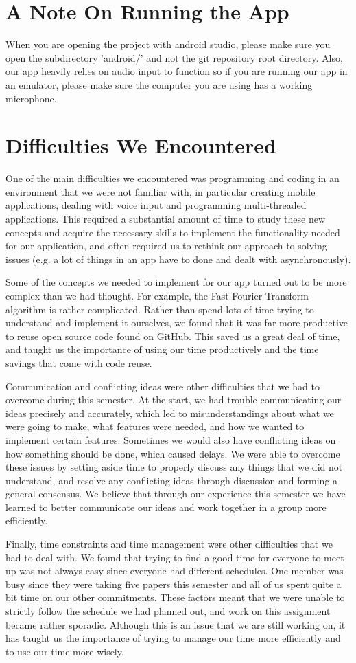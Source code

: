 \documentclass[10pt,a4paper]{article}
\begin{document}
\section{A Note On Running the App}
When you are opening the project with android studio, please make sure you open the subdirectory 'android/' and not the git repository root directory. Also, our app heavily relies on audio input to function so if you are running our app in an emulator, please make sure the computer you are using has a working microphone.

\section{Difficulties We Encountered}
One of the main difficulties we encountered was programming and coding in an environment that we were not familiar with, in particular creating mobile applications, dealing with voice input and programming multi-threaded applications. This required a substantial amount of time to study these new concepts and acquire the necessary skills to implement the functionality needed for our application, and often required us to rethink our approach to solving issues (e.g. a lot of things in an app have to done and dealt with asynchronously).

Some of the concepts we needed to implement for our app turned out to be more complex than we had thought. For example, the Fast Fourier Transform algorithm is rather complicated. Rather than spend lots of time trying to understand and implement it ourselves, we found that it was far more productive to reuse open source code found on GitHub. This saved us a great deal of time, and taught us the importance of using our time productively and the time savings that come with code reuse.

Communication and conflicting ideas were other difficulties that we had to overcome during this semester. At the start, we had trouble communicating our ideas precisely and accurately, which led to misunderstandings about what we were going to make, what features were needed, and how we wanted to implement certain features. Sometimes we would also have conflicting ideas on how something should be done, which caused delays. We were able to overcome these issues by setting aside time to properly discuss any things that we did not understand, and resolve any conflicting ideas through discussion and forming a general consensus. We believe that through our experience this semester we have learned to better communicate our ideas and work together in a group more efficiently.

Finally, time constraints and time management were other difficulties that we had to deal with. We found that trying to find a good time for everyone to meet up was not always easy since everyone had different schedules. One member was busy since they were taking five papers this semester and all of us spent quite a bit time on our other commitments. These factors meant that we were unable to strictly follow the schedule we had planned out, and work on this assignment became rather sporadic. Although this is an issue that we are still working on, it has taught us the importance of trying to manage our time more efficiently and to use our time more wisely.
\end{document}
